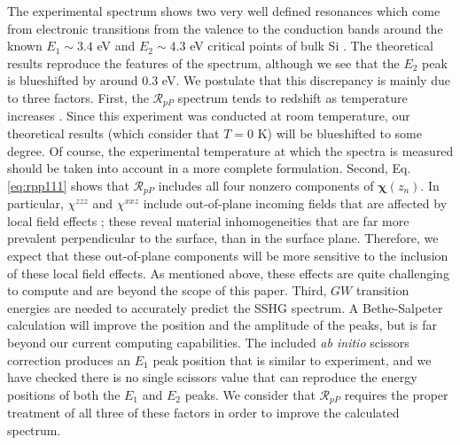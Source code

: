 \documentclass[utf8]{frontiersSCNS}
\begin{document}
{\color{red}
The experimental spectrum shows two very well defined resonances which come from
electronic transitions from the valence to the conduction bands around the known
$E_{1}\sim 3.4$ eV and $E_{2}\sim 4.3$ eV critical points of bulk Si
\citep{yubook}. The theoretical results reproduce the features of the spectrum,
although we see that the $E_{2}$ peak is blueshifted by around 0.3 eV. We
postulate that this discrepancy is mainly due to three factors. First, the
$\mathcal{R}_{pP}$ spectrum tends to redshift as temperature increases
\citep{dadapPRB97}. Since this experiment was conducted at room temperature, our
theoretical results (which consider that $T=0$ K) will be blueshifted to some
degree. Of course, the experimental temperature at which the spectra is measured
should be taken into account in a more complete formulation. Second, Eq.
\eqref{eq:rpp111} shows that $\mathcal{R}_{pP}$ includes all four nonzero
components of $\boldsymbol{\chi}(z_{n})$. In particular, $\chi^{zzz}$ and
$\chi^{xxz}$ include out-of-plane incoming fields that are affected by local
field effects \citep{tancognedejean:tel-01235611}; these reveal material
inhomogeneities that are far more prevalent perpendicular to the surface, than
in the surface plane. Therefore, we expect that these out-of-plane components
will be more sensitive to the inclusion of these local field effects. As
mentioned above, these effects are quite challenging to compute
\citep{nicolasPRB15} and are beyond the scope of this paper. Third, $GW$
transition energies are needed to accurately predict the SSHG spectrum. A
Bethe-Salpeter calculation will improve the position and the amplitude of the
peaks, but is far beyond our current computing capabilities. The included
\emph{ab initio} scissors correction produces an $E_{1}$ peak position that is
similar to experiment, and we have checked there is no single scissors value
that can reproduce the energy positions of both the $E_{1}$ and $E_{2}$ peaks.
We consider that $\mathcal{R}_{pP}$ requires the proper treatment of all three
of these factors in order to improve the calculated spectrum.
}
\end{document}
